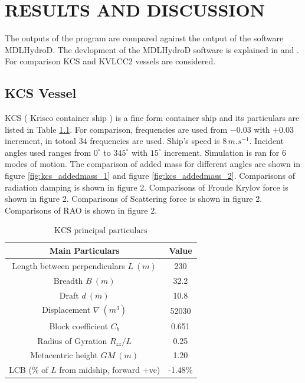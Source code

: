 \chapter{RESULTS AND DISCUSSION}
The outputs of the program are compared against the output of the software MDLHydroD. The devlopment of the 
MDLHydroD software is explained in \cite{guha2013development} and \cite{guha2015estimation}.
For comparison KCS and KVLCC2 vessels are considered. 

\section{KCS Vessel}
KCS ( Krisco container ship ) is a fine form container ship and its particulars are listed in Table 
\ref{tab:kcs_principal_particulars}. 
For comparison, frequencies are used from
$-0.03$ with $+0.03$ increment, in totoal $34$ frequencies are used. Ship's speed is $8\,\si{m.s^{-1}}$. Incident angles used 
ranges from $0^{\circ}$ to $345^{\circ}$ with $15^{\circ}$ increment. Simulation is ran for 6 modes of motion.  
The comparison of added mass for different angles are shown in figure \ref{fig:kcs_addedmass_1} and figure \ref{fig:kcs_addedmass_2}.
Comparisons of radiation damping is shown in figure 2. Comparisons of Froude Krylov force is shown in figure 2.
Comparisons of Scattering force is shown in figure 2. Comparisons of RAO is shown in figure 2.

\begin{table}[h]
    \centering
    \setlength{\tabcolsep}{10pt} %
    \renewcommand{\arraystretch}{1.17} %
    \begin{tabular}{|c|c|}
        \hline
        {\bf Main Particulars} & {\bf Value} \\
        \hline 
        Length between perpendiculars $L ~(m)$ & 230 \\ 
        Breadth $B ~(m)$ & 32.2  \\
        Draft $d ~(m)$ & 10.8  \\
        Displacement $\nabla ~(m^{3})$ & 52030  \\
        Block coefficient $C_{b}$ & 0.651   \\
        Radius of Gyration $R_{zz}/L$ & 0.25 \\
        Metacentric height $GM ~(m)$ & 1.20 \\
        LCB (\% of $L$ from midship, forward +ve) & -1.48\% \\
        \hline
    \end{tabular}
    \caption{$\text{KCS principal particulars}$}
    \label{tab:kcs_principal_particulars}
\end{table}


